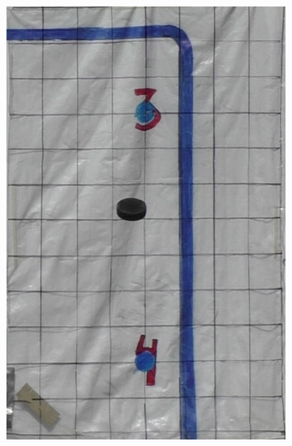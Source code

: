 \documentclass[a4paper,12pt]{article}
\begin{document}
\begin{figure}[ht]
  \centering
  \begin{subfigure}[t]{0.24\textwidth}
    \centering
    \includegraphics[width=\linewidth]{photos/skott1.png}
  \end{subfigure}%
  \hspace*{\fill}
  \begin{subfigure}[t]{0.24\textwidth}
    \centering

\end{subfigure}
\end{figure}
\end{document}
